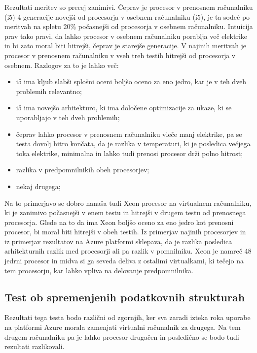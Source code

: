 Rezultati meritev so precej zanimivi. Čeprav je procesor v prenosnem računalniku (i5) 4 generacije novejši od procesorja v osebnem računalniku (i5), je ta sodeč po meritvah na spletu 20\% počasnejši od procesorja v osebnem računalniku. Intuicija prav tako pravi, da lahko procesor v osebnem računalniku porablja več elektrike in bi zato moral biti hitrejši, čeprav je starejše generacije. V najinih meritvah je procesor v prenosnem računalniku v vseh treh testih hitrejši od procesorja v osebnem. Razlogov za to je lahko več:

\begin{itemize}
	\item i5 ima kljub slabši splošni oceni boljšo oceno za eno jedro, kar je v teh dveh problemih relevantno;
	\item i5 ima novejšo arhitekturo, ki ima določene optimizacije za ukaze, ki se uporabljajo v teh dveh problemih;
	\item čeprav lahko procesor v prenosnem računalniku vleče manj elektrike, pa se testa dovolj hitro končata, da je razlika v temperaturi, ki je posledica večjega toka elektrike, minimalna in lahko tudi prenosi procesor drži polno hitrost;
	\item razlika v predpomnilnikih obeh procesorjev;
	\item nekaj drugega;
\end{itemize}

Na to primerjavo se dobro nanaša tudi Xeon procesor na virtualnem računalniku, ki je zanimivo počasnejši v enem testu in hitrejši v drugem testu od prenosnega procesorja. Glede na to da ima Xeon boljšo oceno za eno jedro kot prenosni procesor, bi moral biti hitrejši v obeh testih. Iz primerjav najinih procesorjev in iz primerjav rezultatov na Azure platformi sklepava, da je razlika posledica arhitekturnih razlik med procesorji ali pa razlik v pomnilniku. Xeon je namreč 48 jedrni procesor in midva si ga seveda deliva z ostalimi virtualkami, ki tečejo na tem procesorju, kar lahko vpliva na delovanje predpomnilnika.




\subsection{Test ob spremenjenih podatkovnih strukturah}

Rezultati tega testa bodo različni od zgornjih, ker sva zaradi izteka roka uporabe na platformi Azure morala zamenjati virtualni računalnik za drugega. Na tem drugem računalniku pa je lahko procesor drugačen in posledično se bodo tudi rezultati razlikovali.

